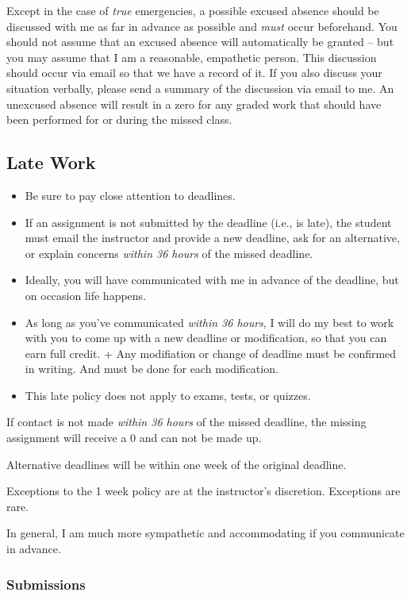 Except in the case of \emph{true} emergencies, a possible excused absence should be discussed with me as far in advance as possible and \emph{must} occur beforehand.
You should not assume that an excused absence will automatically be granted -- but you may assume that I am a reasonable, empathetic person.
This discussion should occur via email so that we have a record of it.
If you also discuss your situation verbally, please send a summary of the discussion via email to me.
An unexcused absence will result in a zero for any graded work that should have been performed for or during the missed class.

\hypertarget{late-work}{%
\subsection{Late Work}\label{late-work}}

\begin{itemize}
\tightlist
\item
  Be sure to pay close attention to deadlines.
\item
  If an assignment is not submitted by the deadline (i.e., is late), the student must email the instructor and provide a new deadline, ask for an alternative, or explain concerns \emph{within 36 hours} of the missed deadline.
\item
  Ideally, you will have communicated with me in advance of the deadline, but on occasion life happens.
\item
  As long as you've communicated \emph{within 36 hours}, I will do my best to work with you to come up with a new deadline or modification, so that you can earn full credit. + Any modifiation or change of deadline must be confirmed in writing. And must be done for each modification.
\item
  This late policy does not apply to exams, tests, or quizzes.
\end{itemize}

If contact is not made \emph{within 36 hours} of the missed deadline, the missing assignment will receive a 0 and can not be made up.

Alternative deadlines will be within one week of the original deadline.

Exceptions to the 1 week policy are at the instructor's discretion. Exceptions are rare.

In general, I am much more sympathetic and accommodating if you communicate in advance.

\hypertarget{submissions}{%
\subsubsection{Submissions}\label{submissions}}

